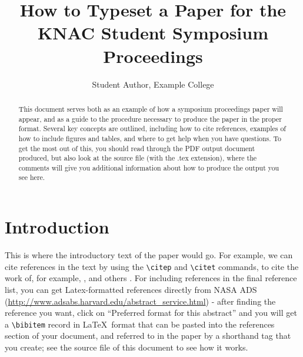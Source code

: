 \documentclass{knac}
\begin{document}
\title{How to Typeset a Paper for the KNAC Student Symposium Proceedings}


\author{Student Author, Example College}



\begin{abstract}

  This document serves both as an example of how a symposium
  proceedings paper will appear, and as a guide to the procedure
  necessary to produce the paper in the proper format. Several key
  concepts are outlined, including how to cite references, examples of
  how to include figures and tables, and where to get help when you
  have questions.  To get the most out of this, you should read
  through the PDF output document produced, but also look at the
  source file (with the .tex extension), where the comments will give
  you additional information about how to produce the output you see
  here. 

\end{abstract}



\section{Introduction}

This is where the introductory text of the paper would go.  For
example, we can cite references in the text by using the \verb|\citep|
and \verb|\citet| commands, to cite the work of, for example,
\citet{Bary2002}, and others \citep{Kwitter2013, Willman2012}.  For
including references in the final reference list, you can get
Latex-formatted references directly from NASA ADS
(\url{http://www.adsabs.harvard.edu/abstract_service.html}) - after
finding the reference you want, click on ``Preferred format for this
abstract'' and you will get a \verb|\bibitem| record in \LaTeX\ format
that can be pasted into the references section of your document, and
referred to in the paper by a shorthand tag that you create; see the
source file of this document to see how it works.
\end{document}
